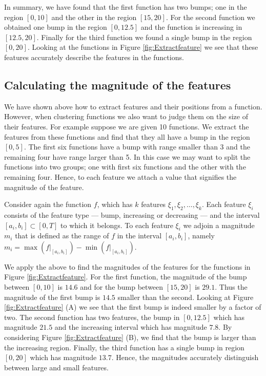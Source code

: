 \documentclass[12pt]{book} %
\begin{document}
  In summary, we have found that the first function has two bumps; one in the region $[0,10]$ and the other in the region $[15,20]$. For the second function we obtained one bump in the region $[0,12.5]$ and the function is increasing in $[12.5,20]$. Finally for the third function we found a single bump in the region $[0,20]$. Looking at the functions in Figure \ref{fig:Extractfeature} we see that these features accurately describe the features in the functions. 
  
    
\subsection{Calculating the magnitude of the features}
We have shown above how to extract features and their positions from a function. However, when clustering functions we also want to judge them on the size of their features. For example suppose we are given 10 functions. We extract the features from these functions and find that they all have a bump in the region $[0,5]$. The first six functions have a bump with range smaller than 3 and the remaining four have range larger than 5. In this case we may want to split the functions into two groups; one with first six functions and the other with the remaining four. Hence, to each feature we attach a value that signifies the magnitude of the feature. 

 Consider again the function $f$, which has $k$ features $\xi_1, \xi_2,\dots, \xi_k$. Each feature $\xi_i$ consists of the feature type --- bump, increasing or decreasing --- and the interval $[a_i,b_i] \subset [0,T]$ to which it belongs. To each feature $\xi_i$ we adjoin a magnitude $m_i$ that is defined as the range of $f$ in the interval $[a_i,b_i]$, namely $m_i = \max (f|_{[a_i,b_i]}) - \min (f|_{[a_i,b_i]})$. 
 
 We apply the above to find the magnitudes of the features for the functions in  Figure \ref{fig:Extractfeature}. For the first function, the magnitude of the bump between $[0,10]$ is $14.6$ and for the bump between $[15,20]$ is $29.1$.  Thus the magnitude of the first bump is $14.5$ smaller than the second. Looking at Figure \ref{fig:Extractfeature} (A) we see that the first bump is indeed smaller by a factor of two. The second function has two features, the bump in $[0,12.5]$ which has magnitude $21.5$ and the increasing interval which has magnitude $7.8$. By considering Figure \ref{fig:Extractfeature} (B), we find that the bump is larger than the increasing region. Finally, the third function has a single bump in region $[0,20]$ which has magnitude $13.7$. Hence, the magnitudes accurately distinguish between large and small features. 
\end{document}
